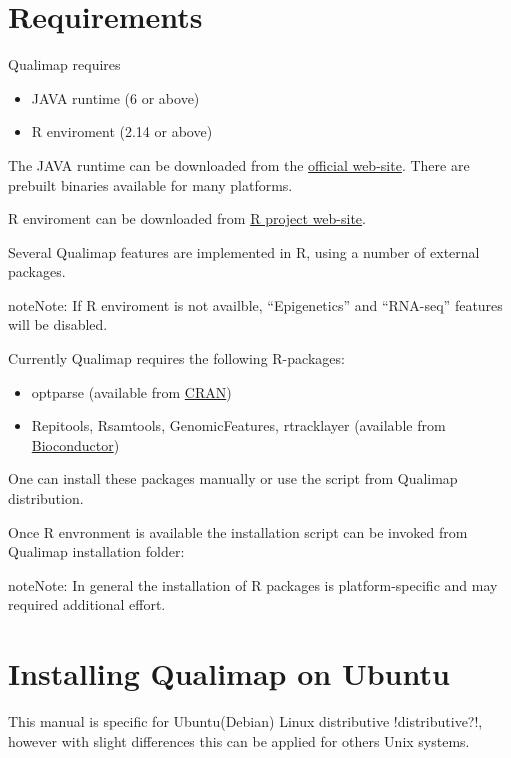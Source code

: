 \documentclass[a4paper,10pt,english]{sphinxmanual}
\begin{document}
\section{Requirements}
\label{intro:requirements}
Qualimap requires
\begin{itemize}
\item {} 
JAVA runtime (6 or above)

\item {} 
R enviroment (2.14 or above)

\end{itemize}

The JAVA runtime can be downloaded from the \href{http://www.java.com}{official web-site}.
There are prebuilt binaries available for many platforms.

R enviroment can be downloaded from \href{http://www.r-project.org}{R project web-site}.

Several Qualimap features are implemented in R, using a number of external packages.

\begin{notice}{note}{Note:}
If R enviroment is not availble, ``Epigenetics'' and ``RNA-seq'' features will be disabled.
\end{notice}

Currently Qualimap requires the following R-packages:
\begin{itemize}
\item {} 
optparse (available from \href{http://cran.r-project.org}{CRAN})

\item {} 
Repitools, Rsamtools, GenomicFeatures, rtracklayer (available from \href{http://bioconductor.org}{Bioconductor})

\end{itemize}

One can install these packages manually or use the script from Qualimap distribution.

Once R envronment is available the installation script can be invoked from Qualimap installation folder:


\begin{notice}{note}{Note:}
In general the installation of R packages is platform-specific and may required additional effort.
\end{notice}


\section{Installing Qualimap on Ubuntu}
\label{intro:installing-qualimap-on-ubuntu}
This manual is specific for Ubuntu(Debian) Linux distributive !distributive?!, however with slight differences this can be applied for others Unix systems.
\end{document}
